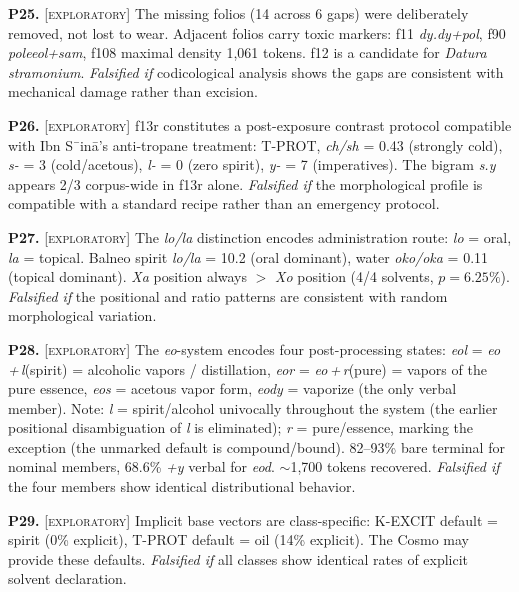 \documentclass[11pt,a4paper]{article}
\newcommand{\exploratory}{\textsc{[exploratory]}}
\newcommand{\falsmark}{\textit{Falsified if}}
\begin{document}
\medskip

\noindent\textbf{P25.} \exploratory{} The missing folios (14 across 6 gaps) were deliberately removed, not lost to wear. Adjacent folios carry toxic markers: f11 \textit{dy.dy+pol}, f90 \textit{poleeol+sam}, f108 maximal density 1,061 tokens. f12 is a candidate for \textit{Datura stramonium}. \falsmark{} codicological analysis shows the gaps are consistent with mechanical damage rather than excision.

\medskip

\noindent\textbf{P26.} \exploratory{} f13r constitutes a post-exposure contrast protocol compatible with Ibn S\={\ i}n\=a's anti-tropane treatment: T-PROT, \textit{ch/sh} = 0.43 (strongly cold), \textit{s-} = 3 (cold/acetous), \textit{l-} = 0 (zero spirit), \textit{y-} = 7 (imperatives). The bigram \textit{s.y} appears 2/3 corpus-wide in f13r alone. \falsmark{} the morphological profile is compatible with a standard recipe rather than an emergency protocol.

\medskip

\noindent\textbf{P27.} \exploratory{} The \textit{lo/la} distinction encodes administration route: \textit{lo} = oral, \textit{la} = topical. Balneo spirit \textit{lo/la} = 10.2 (oral dominant), water \textit{oko/oka} = 0.11 (topical dominant). \textit{Xa} position always $>$ \textit{Xo} position (4/4 solvents, $p = 6.25\%$). \falsmark{} the positional and ratio patterns are consistent with random morphological variation.

\medskip

\noindent\textbf{P28.} \exploratory{} The \textit{eo}-system encodes four post-processing states: \textit{eol} = \textit{eo\,+\,l}(spirit) = alcoholic vapors / distillation, \textit{eor} = \textit{eo\,+\,r}(pure) = vapors of the pure essence, \textit{eos} = acetous vapor form, \textit{eody} = vaporize (the only verbal member). Note: \textit{l} = spirit/alcohol univocally throughout the system (the earlier positional disambiguation of \textit{l} is eliminated); \textit{r} = pure/essence, marking the exception (the unmarked default is compound/bound). 82--93\% bare terminal for nominal members, 68.6\% \textit{+y} verbal for \textit{eod}. $\sim$1,700 tokens recovered. \falsmark{} the four members show identical distributional behavior.

\medskip

\noindent\textbf{P29.} \exploratory{} Implicit base vectors are class-specific: K-EXCIT default = spirit (0\% explicit), T-PROT default = oil (14\% explicit). The Cosmo may provide these defaults. \falsmark{} all classes show identical rates of explicit solvent declaration.
\end{document}
